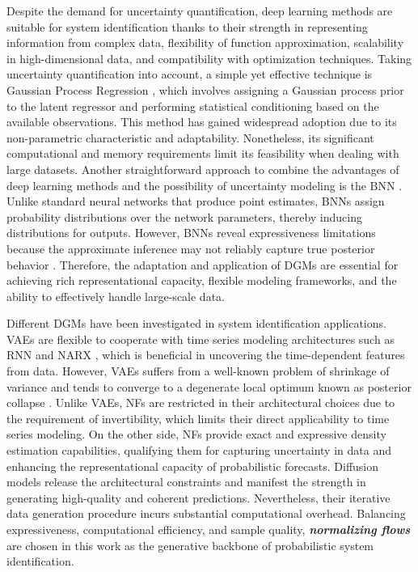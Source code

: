 Despite the demand for uncertainty quantification, deep learning methods are suitable for system identification thanks to their strength in representing information from complex data, flexibility of function approximation, scalability in high-dimensional data, and compatibility with optimization techniques. Taking uncertainty quantification into account, a simple yet effective technique is Gaussian Process Regression \citep{sarkka2019gp}, which involves assigning a Gaussian process prior to the latent regressor and performing statistical conditioning based on the available observations. This method has gained widespread adoption due to its non-parametric characteristic and adaptability. Nonetheless, its significant computational and memory requirements limit its feasibility when dealing with large datasets. Another straightforward approach to combine the advantages of deep learning methods and the possibility of uncertainty modeling is the \acf{BNN} \citep{Goan_2020}. Unlike standard neural networks that produce point estimates, \acp{BNN} assign probability distributions over the network parameters, thereby inducing distributions for outputs. However, \acp{BNN} reveal expressiveness limitations because the approximate inference may not reliably capture true posterior behavior \citep{foong2020bnn}. Therefore, the adaptation and application of \acp{DGM} are essential for achieving rich representational capacity, flexible modeling frameworks, and the ability to effectively handle large-scale data. 

Different \acp{DGM} have been investigated in system identification applications. \acp{VAE} are flexible to cooperate with time series modeling architectures such as \acf{RNN} \citep{Girin_2021} and \acf{NARX} \citep{PANIAGUA2024200344}, which is beneficial in uncovering the time-dependent features from data. However, \acp{VAE} suffers from a well-known problem of shrinkage of variance \citep{asperti2020vae} and tends to converge to a degenerate local optimum known as posterior collapse \citep{wang2023vae}. Unlike \acp{VAE}, \acp{NF} are restricted in their architectural choices due to the requirement of invertibility, which limits their direct applicability to time series modeling. On the other side, \acp{NF} provide exact and expressive density estimation capabilities, qualifying them for capturing uncertainty in data and enhancing the representational capacity of probabilistic forecasts. Diffusion models release the architectural constraints and manifest the strength in generating high-quality and coherent predictions. Nevertheless, their iterative data generation procedure incurs substantial computational overhead. Balancing expressiveness, computational efficiency, and sample quality, {\bfseries\itshape normalizing flows} are chosen in this work as the generative backbone of probabilistic system identification.

